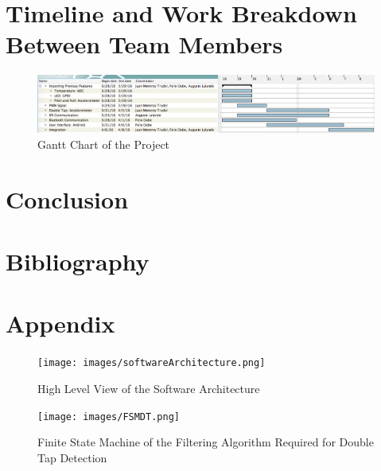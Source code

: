 \documentclass[12pt]{article}
\begin{document}
\section{Timeline and Work Breakdown Between Team Members}
\begin{figure}[!htb]
 \centering
 \includegraphics[scale=0.38]{images/gantt.png}
 \caption{Gantt Chart of the Project}
 \label{fig:Gantt}
\end{figure}
\section{Conclusion}

\newpage
\section{Bibliography}



\newpage
\section{Appendix}
\begin{figure}[!htb]
 \centering
 \texttt{[image: images/softwareArchitecture.png]}
 \caption{High Level View of the Software Architecture}
 \label{fig:softArch}
\end{figure}


\begin{figure}[!htb]
 \centering
 \texttt{[image: images/FSMDT.png]}
 \caption{Finite State Machine of the Filtering Algorithm Required for Double Tap Detection}
 \label{fig:FSMDT}
\end{figure}
\end{document}
